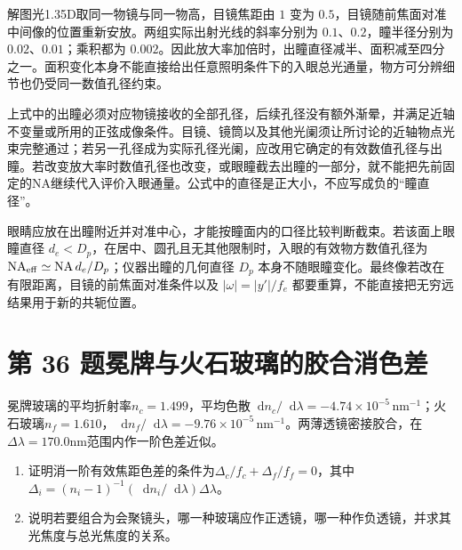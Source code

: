 \documentclass[UTF8,fontset=fandol,a4paper,11pt]{ctexart}
\newcommand{\dd}{\mathop{}\!\mathrm{d}}
\begin{document}
解图光1.35D取同一物镜与同一物高，目镜焦距由 $1$ 变为 $0.5$，目镜随前焦面对准中间像的位置重新安放。两组实际出射光线的斜率分别为 $0.1$、$0.2$，瞳半径分别为 $0.02$、$0.01$；乘积都为 $0.002$。因此放大率加倍时，出瞳直径减半、面积减至四分之一。面积变化本身不能直接给出任意照明条件下的入眼总光通量，物方可分辨细节也仍受同一数值孔径约束。

上式中的出瞳必须对应物镜接收的全部孔径，后续孔径没有额外渐晕，并满足近轴不变量或所用的正弦成像条件。目镜、镜筒以及其他光阑须让所讨论的近轴物点光束完整通过；若另一孔径成为实际孔径光阑，应改用它确定的有效数值孔径与出瞳。若改变放大率时数值孔径也改变，或眼瞳截去出瞳的一部分，就不能把先前固定的$\mathrm{NA}$继续代入评价入眼通量。公式中的直径是正大小，不应写成负的“瞳直径”。

眼睛应放在出瞳附近并对准中心，才能按瞳面内的口径比较判断截束。若该面上眼瞳直径 $d_e<D_p$，在居中、圆孔且无其他限制时，入眼的有效物方数值孔径为 $\mathrm{NA}_{\rm eff}\simeq\mathrm{NA}\,d_e/D_p$；仪器出瞳的几何直径 $D_p$ 本身不随眼瞳变化。最终像若改在有限距离，目镜的前焦面对准条件以及 $|\omega|=|y'|/f_e$ 都要重算，不能直接把无穷远结果用于新的共轭位置。




\section*{第 36 题\quad 冕牌与火石玻璃的胶合消色差}\label{q:36}

冕牌玻璃的平均折射率$n_c=1.499$，平均色散$\dd n_c/\dd\lambda=-4.74\times10^{-5}\,\mathrm{nm}^{-1}$；火石玻璃$n_f=1.610$，$\dd n_f/\dd\lambda=-9.76\times10^{-5}\,\mathrm{nm}^{-1}$。两薄透镜密接胶合，在$\Delta\lambda=170.0$nm范围内作一阶色差近似。
\begin{enumerate}
\item 证明消一阶有效焦距色差的条件为$\Delta_c/f_c+\Delta_f/f_f=0$，其中$\Delta_i=(n_i-1)^{-1}(\dd n_i/\dd\lambda)\Delta\lambda$。
\item 说明若要组合为会聚镜头，哪一种玻璃应作正透镜，哪一种作负透镜，并求其光焦度与总光焦度的关系。
\end{enumerate}
\end{document}
